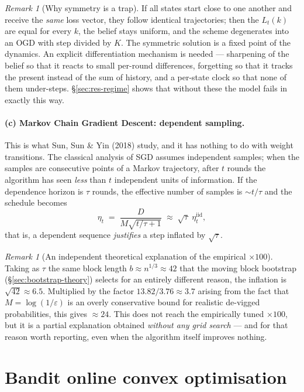 \documentclass[12pt,a4paper,oneside]{report}
\renewcommand{\_}{\oldunderscore\allowbreak}
\theoremstyle{definition}
\theoremstyle{plain}
\theoremstyle{remark}
\newtheorem{remark}[theorem]{Remark}
\begin{document}
\begin{remark}[Why symmetry is a trap]
\label{rem:symmetry}
If all states start close to one another and receive the \emph{same} loss vector, they follow
identical trajectories; then the $L_t(k)$ are equal for every $k$, the belief stays uniform, and
the scheme degenerates into an OGD with step divided by $K$. The symmetric solution is a fixed
point of the dynamics. An explicit differentiation mechanism is needed --- sharpening of the
belief so that it reacts to small per-round differences, forgetting so that it tracks the present
instead of the sum of history, and a per-state clock so that none of them under-steps.
\S\ref{sec:res-regime} shows that without these the model fails in exactly this way.
\end{remark}

\paragraph{(c) Markov Chain Gradient Descent: dependent sampling.} This is what Sun, Sun \& Yin
(2018) study, and it has nothing to do with weight transitions. The classical analysis of SGD
assumes independent samples; when the samples are consecutive points of a Markov trajectory,
after $t$ rounds the algorithm has seen \emph{less} than $t$ independent units of information. If
the dependence horizon is $\tau$ rounds, the effective number of samples is $\sim t/\tau$ and the
schedule becomes
\[
\eta_t \;=\; \frac{D}{M\sqrt{t/\tau + 1}} \;\approx\; \sqrt{\tau}\;\eta_t^{\text{iid}},
\]
that is, a dependent sequence \emph{justifies} a step inflated by $\sqrt{\tau}$.

\begin{remark}[An independent theoretical explanation of the empirical $\times100$]
Taking as $\tau$ the same block length $b \approx n^{1/3} \approx 42$ that the moving block
bootstrap (\S\ref{sec:bootstrap-theory}) selects for an entirely different reason, the inflation
is $\sqrt{42}\approx 6.5$. Multiplied by the factor $13.82/3.76 \approx 3.7$ arising from the
fact that $M=\log(1/\varepsilon)$ is an overly conservative bound for realistic de-vigged
probabilities, this gives $\approx 24$. This does not reach the empirically tuned $\times100$,
but it is a partial explanation obtained \emph{without any grid search} --- and for that reason
worth reporting, even when the algorithm itself improves nothing.
\end{remark}

\section{Bandit online convex optimisation}
\label{sec:bandit-theory}
\end{document}
